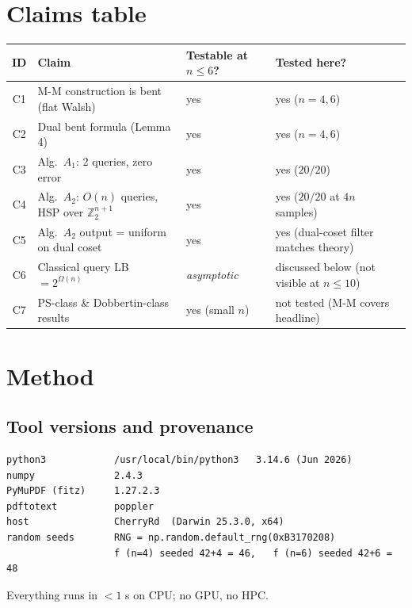 \documentclass[11pt]{article}
\begin{document}
\section{Claims table}
\begin{center}
\begin{tabular}{@{}c l l l@{}}
\toprule
ID & Claim & Testable at $n\!\le\!6$? & Tested here? \\
\midrule
C1 & M-M construction is bent (flat Walsh) & yes & yes ($n=4,6$) \\
C2 & Dual bent formula (Lemma 4)           & yes & yes ($n=4,6$) \\
C3 & Alg.\ $A_1$: 2 queries, zero error    & yes & yes ($20/20$) \\
C4 & Alg.\ $A_2$: $O(n)$ queries, HSP over $\mathbb{Z}_2^{n+1}$ & yes & yes ($20/20$ at $4n$ samples) \\
C5 & Alg.\ $A_2$ output = uniform on dual coset & yes & yes (dual-coset filter matches theory) \\
C6 & Classical query LB $=2^{\Omega(n)}$   & \emph{asymptotic} & discussed below (not visible at $n\!\le\!10$) \\
C7 & PS-class \& Dobbertin-class results   & yes (small $n$) & not tested (M-M covers headline) \\
\bottomrule
\end{tabular}
\end{center}

\section{Method}
\subsection{Tool versions and provenance}
\begin{lstlisting}[caption={Environment.}]
python3            /usr/local/bin/python3   3.14.6 (Jun 2026)
numpy              2.4.3
PyMuPDF (fitz)     1.27.2.3
pdftotext          poppler
host               CherryRd  (Darwin 25.3.0, x64)
random seeds       RNG = np.random.default_rng(0xB3170208)
                   f (n=4) seeded 42+4 = 46,   f (n=6) seeded 42+6 = 48
\end{lstlisting}
Everything runs in $<1$ s on CPU; no GPU, no HPC.
\end{document}
